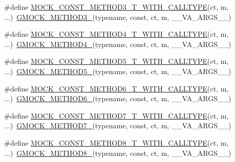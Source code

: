 \begin{DoxyCompactItemize}
\item 
\#define \hyperlink{gmock-generated-function-mockers_8h_ac19708f4d74bb11d9aeecb7c5b74dec8}{M\+O\+C\+K\+\_\+\+C\+O\+N\+S\+T\+\_\+\+M\+E\+T\+H\+O\+D3\+\_\+\+T\+\_\+\+W\+I\+T\+H\+\_\+\+C\+A\+L\+L\+T\+Y\+PE}(ct,  m, ...)~\hyperlink{gmock-generated-function-mockers_8h_af7c77ba511c631de02bb8c45a6ed3045}{G\+M\+O\+C\+K\+\_\+\+M\+E\+T\+H\+O\+D3\+\_\+}(typename, const, ct, m, \+\_\+\+\_\+\+V\+A\+\_\+\+A\+R\+G\+S\+\_\+\+\_\+)
\item 
\#define \hyperlink{gmock-generated-function-mockers_8h_acd1c5b5fca7c75ef5ed812f1e495a3f7}{M\+O\+C\+K\+\_\+\+C\+O\+N\+S\+T\+\_\+\+M\+E\+T\+H\+O\+D4\+\_\+\+T\+\_\+\+W\+I\+T\+H\+\_\+\+C\+A\+L\+L\+T\+Y\+PE}(ct,  m, ...)~\hyperlink{gmock-generated-function-mockers_8h_ab6430f2cfad9de4aca5258ea559294bb}{G\+M\+O\+C\+K\+\_\+\+M\+E\+T\+H\+O\+D4\+\_\+}(typename, const, ct, m, \+\_\+\+\_\+\+V\+A\+\_\+\+A\+R\+G\+S\+\_\+\+\_\+)
\item 
\#define \hyperlink{gmock-generated-function-mockers_8h_ae1e95e9eb000b737025cb74da20398ac}{M\+O\+C\+K\+\_\+\+C\+O\+N\+S\+T\+\_\+\+M\+E\+T\+H\+O\+D5\+\_\+\+T\+\_\+\+W\+I\+T\+H\+\_\+\+C\+A\+L\+L\+T\+Y\+PE}(ct,  m, ...)~\hyperlink{gmock-generated-function-mockers_8h_a9e3ecd392499ab19a4a6d3adcabf56f6}{G\+M\+O\+C\+K\+\_\+\+M\+E\+T\+H\+O\+D5\+\_\+}(typename, const, ct, m, \+\_\+\+\_\+\+V\+A\+\_\+\+A\+R\+G\+S\+\_\+\+\_\+)
\item 
\#define \hyperlink{gmock-generated-function-mockers_8h_a3acffd86eecfbcfe829231930406610b}{M\+O\+C\+K\+\_\+\+C\+O\+N\+S\+T\+\_\+\+M\+E\+T\+H\+O\+D6\+\_\+\+T\+\_\+\+W\+I\+T\+H\+\_\+\+C\+A\+L\+L\+T\+Y\+PE}(ct,  m, ...)~\hyperlink{gmock-generated-function-mockers_8h_ad0ca7f6973a076d0af4c953f8ed91842}{G\+M\+O\+C\+K\+\_\+\+M\+E\+T\+H\+O\+D6\+\_\+}(typename, const, ct, m, \+\_\+\+\_\+\+V\+A\+\_\+\+A\+R\+G\+S\+\_\+\+\_\+)
\item 
\#define \hyperlink{gmock-generated-function-mockers_8h_ac041233126a7740a136fc7a9737613dd}{M\+O\+C\+K\+\_\+\+C\+O\+N\+S\+T\+\_\+\+M\+E\+T\+H\+O\+D7\+\_\+\+T\+\_\+\+W\+I\+T\+H\+\_\+\+C\+A\+L\+L\+T\+Y\+PE}(ct,  m, ...)~\hyperlink{gmock-generated-function-mockers_8h_ab98a8399ba62b53b375c2807f4d39d2f}{G\+M\+O\+C\+K\+\_\+\+M\+E\+T\+H\+O\+D7\+\_\+}(typename, const, ct, m, \+\_\+\+\_\+\+V\+A\+\_\+\+A\+R\+G\+S\+\_\+\+\_\+)
\item 
\#define \hyperlink{gmock-generated-function-mockers_8h_aa4ed75d9f9d23eb0a00543d3ac1ed093}{M\+O\+C\+K\+\_\+\+C\+O\+N\+S\+T\+\_\+\+M\+E\+T\+H\+O\+D8\+\_\+\+T\+\_\+\+W\+I\+T\+H\+\_\+\+C\+A\+L\+L\+T\+Y\+PE}(ct,  m, ...)~\hyperlink{gmock-generated-function-mockers_8h_aa84a36427c44505207b7cad5dec7ad67}{G\+M\+O\+C\+K\+\_\+\+M\+E\+T\+H\+O\+D8\+\_\+}(typename, const, ct, m, \+\_\+\+\_\+\+V\+A\+\_\+\+A\+R\+G\+S\+\_\+\+\_\+)

\end{DoxyCompactItemize}
